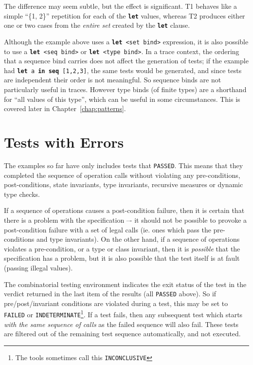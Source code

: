 \documentclass{overturerepchap}
\begin{document}
\noindent The difference may seem subtle, but the effect is significant. T1 behaves like a
simple ``\{1, 2\}'' repetition for each of the \texttt{\textbf{let}} values, whereas T2
produces either one or two cases from the \emph{entire set} created by the \texttt{\textbf{let}}
clause.

Although the example above uses a \texttt{\textbf{let} <set bind>} expression, it is also
possible to use a \texttt{\textbf{let} <seq bind>} or \texttt{\textbf{let} <type bind>}. In a
trace context, the ordering that a sequence bind carries does not affect the
generation of tests; if the example had \texttt{\textbf{let} a \textbf{in seq} [1,2,3]}, the
same tests would be generated, and since tests are independent their order is not
meaningful. So sequence binds are not particularly useful in traces. However
type binds (of finite types) are a shorthand for ``all values of this type'',
which can be useful in some circumstances. This is covered later in Chapter~\ref{chap:patterns}.

\section{Tests with Errors}

The examples so far have only includes tests that \texttt{PASSED}. This means
that they completed the sequence of operation calls without violating any pre-conditions,
post-conditions, state invariants, type invariants, recursive measures or dynamic
type checks.

If a sequence of operations causes a post-condition failure, then it
is certain that there is a problem with the specification –- it should not be
possible to provoke a post-condition failure with a set of legal calls (ie. ones
which pass the pre-conditions and type invariants). On the other hand, if a 
sequence of operations violates a pre-condition, or a type or class invariant, 
then it is \emph{possible} that the specification has a problem, but it is also 
possible that the test itself is at fault (passing illegal values).

The combinatorial testing environment indicates the exit status of the test  in
the verdict returned in the last item of the results (all \texttt{PASSED} above). So if 
pre/post/invariant conditions are violated during a test, this may be set to 
\texttt{FAILED} or \texttt{INDETERMINATE}\footnote{The tools sometimes call this \texttt{INCONCLUSIVE}}. If
a test fails, then any subsequent test which starts \emph{with the same
sequence of calls} as the failed sequence will also fail. These tests are
filtered out of the remaining test sequence automatically, and not executed.
\end{document}
